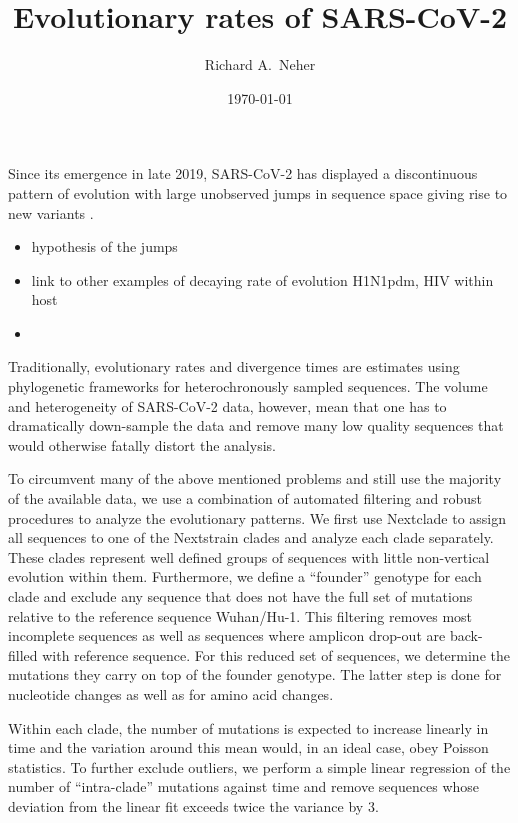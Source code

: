 \documentclass[aps,rmp, onecolumn]{revtex4}
\begin{document}
\title{Evolutionary rates of SARS-CoV-2}
\author{Richard A.~Neher}
\date{\today}
\maketitle

Since its emergence in late 2019, SARS-CoV-2 has displayed a discontinuous pattern of evolution with large unobserved jumps in sequence space giving rise to new variants \citep{alpha,beta,gamma,delta,omicron}.
\begin{itemize}
    \item hypothesis of the jumps
    \item link to other examples of decaying rate of evolution H1N1pdm, HIV within host
    \item
\end{itemize}

Traditionally, evolutionary rates and divergence times are estimates using phylogenetic frameworks for heterochronously sampled sequences.
The volume and heterogeneity of SARS-CoV-2 data, however, mean that one has to dramatically down-sample the data and remove many low quality sequences that would otherwise fatally distort the analysis.


To circumvent many of the above mentioned problems and still use the majority of the available data, we use a combination of automated filtering and robust procedures to analyze the evolutionary patterns.
We first use Nextclade \citep{aksamentov_nextclade_2021} to assign all sequences to one of the Nextstrain \citep{hadfield_nextstrain_2018} clades and analyze each clade separately.
These clades represent well defined groups of sequences with little non-vertical evolution within them.
Furthermore, we define a ``founder'' genotype for each clade and exclude any sequence that does not have the full set of mutations relative to the reference sequence Wuhan/Hu-1.
This filtering removes most incomplete sequences as well as sequences where amplicon drop-out are back-filled with reference sequence.
For this reduced set of sequences, we determine the mutations they carry on top of the founder genotype.
The latter step is done for nucleotide changes as well as for amino acid changes.

Within each clade, the number of mutations is expected to increase linearly in time and the variation around this mean would, in an ideal case, obey Poisson statistics.
To further exclude outliers, we perform a simple linear regression of the number of ``intra-clade'' mutations against time and remove sequences whose deviation from the linear fit exceeds twice the variance by 3.
\end{document}

